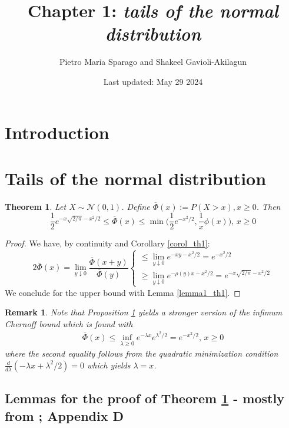 \documentclass{article}
\title{Chapter 1: \emph{tails of the normal distribution}}
\author{Pietro Maria Sparago and Shakeel Gavioli-Akilagun}
\date{\small Last updated: May 29 2024}
\newtheorem{remark}{Remark}[section]
\newtheorem{theorem}{Theorem}[section]
\begin{document}
\maketitle

\section{Introduction}

\section{Tails of the normal distribution}

\begin{theorem}  
\label{th1}	
Let $X \sim \mathcal{N}(0,1)$. Define $\overline{\Phi}(x):=P(X>x),x\geq 0$. Then
\begin{equation}
\frac{1}{2}e^{-x\sqrt{2/\pi}-x^2/2}\leq \overline{\Phi}(x)\leq \min\bigg(\frac{1}{2}e^{-x^2/2},\frac{1}{x}\phi(x)\bigg),\,x\geq 0
\end{equation}
\end{theorem}
\begin{proof} We have, by continuity and Corollary \ref{corol_th1}:
\begin{equation}
2\bar{\Phi}(x)=\lim_{y\downarrow 0}\frac{\overline{\Phi}(x+y)}{\overline{\Phi}(y)}
\begin{cases}
\leq \lim_{y\downarrow 0}e^{-xy-x^2/2}=e^{-x^2/2}\\
\geq \lim_{y\downarrow 0}e^{-\rho(y)x-x^2/2}=e^{-x\sqrt{2/\pi}-x^2/2}
\end{cases}
\end{equation}
We conclude for the upper bound with Lemma \ref{lemma1_th1}.
\end{proof}

\begin{remark} Note that Proposition \ref{th1} yields a stronger version of the infimum Chernoff bound which is found with
$$\begin{aligned}\overline{\Phi}(x)\leq \inf_{\lambda \geq 0}e^{-\lambda x}e^{\lambda^2/2}=e^{-x^2/2},\,x\geq 0
\end{aligned}$$
where the second equality follows from the quadratic minimization condition $\frac{d}{d\lambda}(-\lambda x+\lambda^2/2)=0$ which yields $\lambda=x$.
\end{remark}

\subsection{Lemmas for the proof of Theorem \ref{th1} - mostly from \cite{pollard2002user}; Appendix D}
\end{document}
